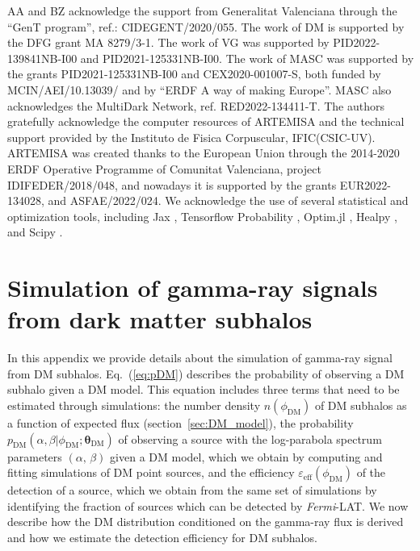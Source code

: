 \documentclass[12pt, a4paper]{article}
\newcommand{\Fermi}{\textsl{Fermi}}
\newcommand{\btheta}{\boldsymbol{\theta}}
\begin{document}
\acknowledgments
%
AA and BZ acknowledge the support from Generalitat Valenciana through the “GenT program”, ref.: CIDEGENT/2020/055.
The work of DM is supported by the DFG grant MA 8279/3-1. 
The work of VG was supported by PID2022-139841NB-I00 and PID2021-125331NB-I00. 
The work of MASC was supported by the grants PID2021-125331NB-I00 and CEX2020-001007-S, both funded by MCIN/AEI/10.13039/ 
and by ``ERDF A way of making Europe''. MASC also acknowledges the MultiDark Network, ref. RED2022-134411-T. 
The authors gratefully acknowledge the computer resources  of ARTEMISA and the technical support provided by the Instituto de Fisica Corpuscular, IFIC(CSIC-UV). ARTEMISA was created thanks to the European Union through the 2014-2020 ERDF Operative Programme of Comunitat Valenciana, project IDIFEDER/2018/048, and nowadays it is supported by the grants
EUR2022-134028, and ASFAE/2022/024. 
We acknowledge the use of several statistical and optimization tools, including Jax \cite{jax}, Tensorflow Probability \cite{tensorflow2015-whitepaper}, Optim.jl \cite{mogensen2018optim}, Healpy \cite{healpy}, and Scipy \cite{scipy}.




\pagebreak

\appendix


\section{Simulation of gamma-ray signals from dark matter subhalos}
\label{app:sim-ps}

In this appendix we provide details about the simulation of gamma-ray signal from DM subhalos.
Eq.~(\ref{eq:pDM}) describes the probability of observing a DM subhalo 
given a DM model.
This equation includes three terms that need to be estimated through simulations: 
the number density $n(\phi_\textrm{DM})$ of DM subhalos as a function of expected flux (section~\ref{sec:DM_model}), the probability $p_\textrm{DM}(\alpha,\beta|\phi_\textrm{DM};\btheta_\textrm{DM})$  of observing a source with the log-parabola spectrum parameters $(\alpha,\,\beta)$ given a DM model, which we obtain by computing and fitting simulations of DM point sources, and the efficiency $\varepsilon_\textrm{eff}(\phi_\textrm{DM})$ of the detection of a source, which we obtain from the same set of simulations by identifying the fraction of sources which can be detected by \Fermi-LAT.  
We now describe how the DM distribution conditioned on the gamma-ray flux is derived and how we estimate the detection efficiency for DM subhalos.
\end{document}
